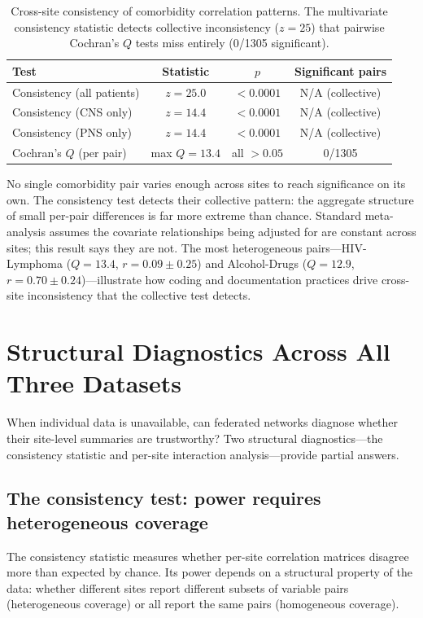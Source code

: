 \documentclass{article}
\begin{document}
\begin{table}[t]
\centering
\caption{Cross-site consistency of comorbidity correlation patterns.  The
multivariate consistency statistic detects collective inconsistency
($z = 25$) that pairwise Cochran's $Q$ tests miss entirely (0/1305
significant).}
\label{tab:consistency}
\begin{tabular}{lccc}
\toprule
Test & Statistic & $p$ & Significant pairs \\
\midrule
Consistency (all patients) & $z = 25.0$ & $< 0.0001$ & N/A (collective) \\
Consistency (CNS only) & $z = 14.4$ & $< 0.0001$ & N/A (collective) \\
Consistency (PNS only) & $z = 14.4$ & $< 0.0001$ & N/A (collective) \\
Cochran's $Q$ (per pair) & max $Q = 13.4$ & all $> 0.05$ & 0/1305 \\
\bottomrule
\end{tabular}
\end{table}

No single comorbidity pair varies enough across sites to reach significance
on its own.  The consistency test detects their collective pattern: the
aggregate structure of small per-pair differences is far more extreme than
chance.  Standard meta-analysis assumes the covariate relationships being
adjusted for are constant across sites; this result says they are not.  The most
heterogeneous pairs---HIV-Lymphoma ($Q = 13.4$, $r = 0.09 \pm 0.25$) and
Alcohol-Drugs ($Q = 12.9$, $r = 0.70 \pm 0.24$)---illustrate how coding
and documentation practices drive cross-site inconsistency that the
collective test detects.


\section{Structural Diagnostics Across All Three Datasets}

When individual data is unavailable, can federated networks diagnose
whether their site-level summaries are trustworthy?  Two structural
diagnostics---the consistency statistic and per-site interaction
analysis---provide partial answers.

\subsection{The consistency test: power requires heterogeneous coverage}

The consistency statistic measures whether per-site correlation matrices
disagree more than expected by chance.  Its power depends on a structural
property of the data: whether different sites report different subsets of
variable pairs (heterogeneous coverage) or all report the same pairs
(homogeneous coverage).
\end{document}
